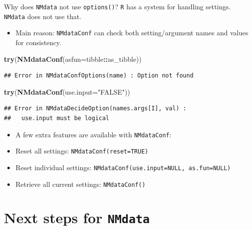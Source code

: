 \documentclass[
  8pt,
  ignorenonframetext,
  aspectratio=169]{beamer}
\newenvironment{Shaded}{\begin{snugshade}}{\end{snugshade}}
\newcommand{\DataTypeTok}[1]{\textcolor[rgb]{0.13,0.29,0.53}{#1}}
\newcommand{\KeywordTok}[1]{\textcolor[rgb]{0.13,0.29,0.53}{\textbf{#1}}}
\newcommand{\NormalTok}[1]{#1}
\newcommand{\OperatorTok}[1]{\textcolor[rgb]{0.81,0.36,0.00}{\textbf{#1}}}
\newcommand{\StringTok}[1]{\textcolor[rgb]{0.31,0.60,0.02}{#1}}
\providecommand{\tightlist}{%
  \setlength{\itemsep}{0pt}\setlength{\parskip}{0pt}}
\begin{document}
\begin{frame}[fragile]{Why does \texttt{NMdata} not use
\texttt{options()}?}
\protect\hypertarget{why-does-nmdata-not-use-options}{}
\texttt{R} has a system for handling settings. \texttt{NMdata} does not
use that.

\begin{itemize}
\tightlist
\item
  Main reason: \texttt{NMdataConf} can check both setting/argument names
  and values for consistency.
\end{itemize}

\begin{Shaded}
\begin{Highlighting}[]
\KeywordTok{try}\NormalTok{(}\KeywordTok{NMdataConf}\NormalTok{(}\DataTypeTok{asfun=}\NormalTok{tibble}\OperatorTok{::}\NormalTok{as\_tibble))}
\end{Highlighting}
\end{Shaded}

\begin{verbatim}
## Error in NMdataConfOptions(name) : Option not found
\end{verbatim}

\begin{Shaded}
\begin{Highlighting}[]
\KeywordTok{try}\NormalTok{(}\KeywordTok{NMdataConf}\NormalTok{(}\DataTypeTok{use.input=}\StringTok{"FALSE"}\NormalTok{))}
\end{Highlighting}
\end{Shaded}

\begin{verbatim}
## Error in NMdataDecideOption(names.args[I], val) : 
##   use.input must be logical
\end{verbatim}

\begin{itemize}
\tightlist
\item
  A few extra features are available with \texttt{NMdataConf}:
\item
  Reset all settings: \texttt{NMdataConf(reset=TRUE)}
\item
  Reset individual settings:
  \texttt{NMdataConf(use.input=NULL,\ as.fun=NULL)}
\item
  Retrieve all current settings: \texttt{NMdataConf()}
\end{itemize}
\end{frame}

\hypertarget{next-steps-for-nmdata}{%
\section{\texorpdfstring{Next steps for
\texttt{NMdata}}{Next steps for NMdata}}\label{next-steps-for-nmdata}}
\end{document}
